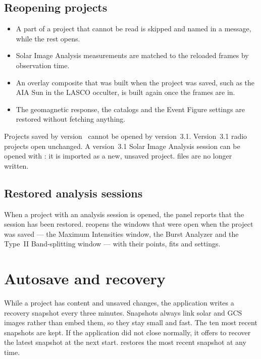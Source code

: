 \subsection{Reopening projects}

\begin{itemize}
  \item A part of a project that cannot be read is skipped and named in a message, while the
    rest opens.
  \item Solar Image Analysis measurements are matched to the reloaded frames by observation
    time.
  \item An overlay composite that was built when the project was saved, such as the AIA Sun in
    the LASCO occulter, is built again once the frames are in.
  \item The geomagnetic response, the catalogs and the Event Figure settings are restored
    without fetching anything.
\end{itemize}

\begin{caution}[Compatibility]
  Projects saved by version~\appversion{} cannot be opened by version~3.1. Version~3.1 radio
  projects open unchanged. A version~3.1  Solar
  Image Analysis session can be opened with : it is imported as a new,
  unsaved project.  files are no longer written.
\end{caution}

\subsection{Restored analysis sessions}
\label{sec:restored-analysis}

When a project with an analysis session is opened, the  panel reports
that the session has been restored.  reopens the windows that were open when the project was saved --- the Maximum
Intensities window, the Burst Analyzer and the Type~II Band-splitting window --- with their
points, fits and settings.

\section{Autosave and recovery}
\label{sec:autosave}

While a project has content and unsaved changes, the application writes a recovery
snapshot every three minutes. Snapshots always link solar and GCS images rather than embed
them, so they stay small and fast. The ten most recent snapshots are kept. If the application
did not close normally, it offers to recover the latest snapshot at the next start.
 restores the most recent snapshot at any time.

